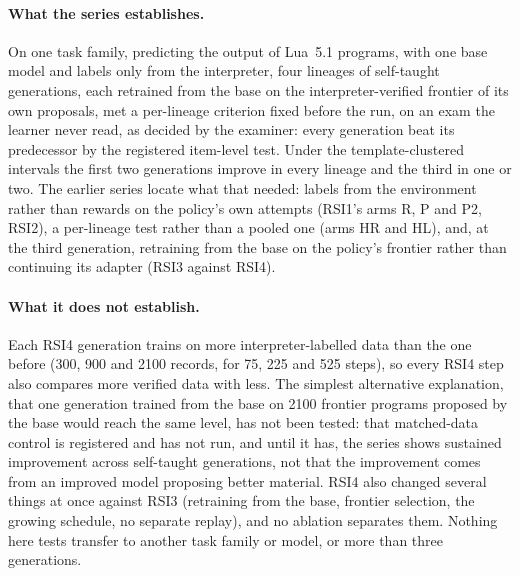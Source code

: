 \paragraph{What the series establishes.} On one task family, predicting the output of Lua~5.1
programs, with one base model and labels only from the interpreter, four lineages of self-taught
generations, each retrained from the base on the interpreter-verified frontier of its own proposals,
met a per-lineage criterion fixed before the run, on an exam the learner never read, as decided by the
examiner: every generation beat its predecessor by the registered item-level test. Under the
template-clustered intervals the first two generations improve in every lineage and the third in one
or two. The earlier series locate what that needed: labels from the environment rather than rewards on
the policy's own attempts (RSI1's arms R, P and P2, RSI2), a per-lineage test rather than a pooled one
(arms HR and HL), and, at the third generation, retraining from the base on the policy's frontier rather
than continuing its adapter (RSI3 against RSI4).

\paragraph{What it does not establish.} Each RSI4 generation trains on more interpreter-labelled data
than the one before (300, 900 and 2100 records, for 75, 225 and 525 steps), so every RSI4 step also
compares more verified data with less. The simplest alternative explanation, that one
generation trained from the base on 2100 frontier programs proposed by the base would reach the same
level, has not been tested: that matched-data control is registered and has not run, and until it has,
the series shows sustained improvement across self-taught generations, not that the improvement comes
from an improved model proposing better material. RSI4 also changed several things at
once against RSI3 (retraining from the base, frontier selection, the growing schedule, no separate
replay), and no ablation separates them. Nothing here tests transfer to another task family or model,
or more than three generations.

